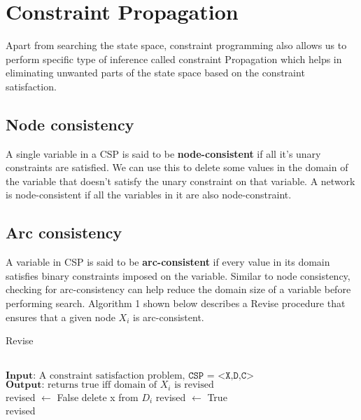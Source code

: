 \section{Constraint Propagation}
Apart from searching the state space, constraint programming also allows us to perform specific type of inference called constraint Propagation which helps in eliminating unwanted parts of the state space based on the constraint satisfaction.
\subsection{Node consistency}
A single variable in a CSP is said to be \textbf{node-consistent} if all it's unary constraints are satisfied. We can use this to delete some values in the domain of the variable that doesn't satisfy the unary constraint on that variable. A network is node-consistent if all the variables in it are also node-constraint.
\subsection{Arc consistency}
A variable in CSP is said to be \textbf{arc-consistent} if every value in its domain satisfies binary constraints imposed on the variable. Similar to node consistency, checking for arc-consistency can help reduce the domain size of a variable before performing search. Algorithm 1 shown below describes a Revise procedure that ensures that a given node $X_{i}$ is arc-consistent.
\begin{algorithm}
  \caption{Revise}\label{revise}
  \begin{algorithmic}[1]
    \\
    $\textbf{Input}\text{: A constraint satisfaction problem,  }\texttt{CSP = <X,D,C>}$\\
    $\textbf{Output}\text{: returns true iff domain of $X_i$ is revised}$ \\
    revised $\gets$ False
    \State delete x from $D_i$
    \EndIf
    \EndFor
    \State revised $\gets$ True\\
    \Return revised
    \EndProcedure
  \end{algorithmic}
\end{algorithm}
